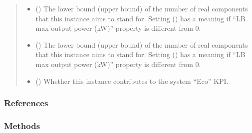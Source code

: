 \documentclass[letterpaper,10pt,english]{sphinxmanual}
\begin{document}
\begin{fulllineitems}
\begin{fulllineitems}
\begin{quote}
\begin{description}
\begin{itemize}
\item {} 
\sphinxAtStartPar
{} (\sphinxstyleliteralemphasis{\sphinxupquote{, }}\sphinxstyleliteralemphasis{\sphinxupquote{, }}) \textendash{} The lower bound (upper bound) of the number of real components that this instance aims to stand for.
Setting  () has a meaning if “LB max output power (kW)” property is
different from 0.

\item {} 
\sphinxAtStartPar
{} (\sphinxstyleliteralemphasis{\sphinxupquote{, }}\sphinxstyleliteralemphasis{\sphinxupquote{, }}) \textendash{} The lower bound (upper bound) of the number of real components that this instance aims to stand for.
Setting  () has a meaning if “LB max output power (kW)” property is
different from 0.

\item {} 
\sphinxAtStartPar
{} (\sphinxstyleliteralemphasis{\sphinxupquote{, }}\sphinxstyleliteralemphasis{\sphinxupquote{, }}) \textendash{} Whether this instance contributes to the system “Eco” KPI.

\end{itemize}

\end{description}\end{quote}
\subsubsection*{References}

\end{fulllineitems}

\subsubsection*{Methods}



\end{fulllineitems}
\end{document}
